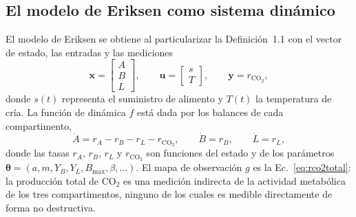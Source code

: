 \subsection{El modelo de Eriksen como sistema dinámico}

El modelo de Eriksen \cite{eriksenDynamicModellingFeed2022} se obtiene al particularizar la
Definición~1.1 con el vector de estado, las entradas y las mediciones
\begin{equation}
\mathbf{x} = \begin{bmatrix} A \\ B \\ L \end{bmatrix},
\qquad
\mathbf{u} = \begin{bmatrix} s \\ T \end{bmatrix},
\qquad
\mathbf{y} = r_{\mathrm{CO_2}},
\label{eq:eriksen-sistema}
\end{equation}
donde $s(t)$ representa el suministro de alimento y $T(t)$ la temperatura de
cría. La función de dinámica $f$ está dada por los balances de cada
compartimento,
\begin{equation}
\dot{A} = r_A - r_B - r_L - r_{\mathrm{CO_2}},
\qquad
\dot{B} = r_B,
\qquad
\dot{L} = r_L,
\label{eq:eriksen-edos}
\end{equation}
donde las tasas $r_A$, $r_B$, $r_L$ y $r_{\mathrm{CO_2}}$ son funciones del
estado y de los parámetros
$\boldsymbol{\theta} = (a, m, Y_B, Y_L, B_{\max}, \beta, \dots)$.
El mapa de observación $g$ es la Ec.~\eqref{eq:rco2total}: la producción
total de CO$_2$ es una medición indirecta de la actividad metabólica de los
tres compartimentos, ninguno de los cuales es medible directamente de forma
no destructiva.

